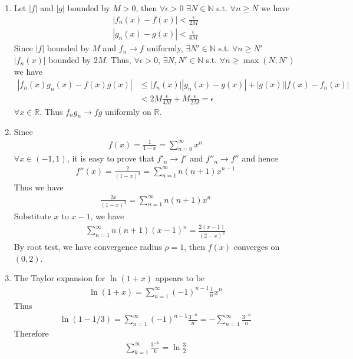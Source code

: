\documentclass[twoside,11pt]{article}
\newcommand{\R}{\mathbb{R}}
\newcommand{\N}{\mathbb{N}}
\theoremstyle{definition}
\theoremstyle{remark}
\begin{document}
\begin{enumerate}
\item Let $|f|$ and $|g|$ bounded by $M>0$, then
$\forall\epsilon>0$ $\exists N\in\N$ s.t.
$\forall n\geq N$ we have
\begin{align*}
    |f_n(x)-f(x)|<\frac{\epsilon}{2M}\\
    |g_n(x)-g(x)|<\frac{\epsilon}{4M}
\end{align*}
Since $|f|$ bounded by $M$ and $f_n\rightarrow f$ uniformly,
$\exists N'\in\N$ s.t. $\forall n\geq N'$ $|f_n(x)|$ bounded by $2M$.
Thus, $\forall\epsilon>0$, $\exists N,N'\in\N$ s.t.
$\forall n\geq\max(N,N')$ we have
\begin{align*}
    |f_n(x)g_n(x)-f(x)g(x)|&\leq
    |f_n(x)||g_n(x)-g(x)| + |g(x)||f(x)-f_n(x)|\\
    &< 2M\frac{\epsilon}{4M} + M\frac{\epsilon}{2M} = \epsilon
\end{align*}
$\forall x\in\R$.
Thus $f_ng_n\rightarrow fg$ uniformly on $\R$.


\item Since
\begin{align*}
    f(x) = \frac{1}{1-x} = \sum_{n=0}^\infty x^n
\end{align*}
$\forall x\in (-1,1)$,
it is easy to prove that $f'_n\rightarrow f'$
and $f''_n\rightarrow f''$ and hence
\begin{align*}
    f''(x) = \frac{2}{(1-x)^3} = \sum_{n=1}^\infty n(n+1)x^{n-1}
\end{align*}
Thus we have
\begin{align*}
    \frac{2x}{(1-x)^3} = \sum_{n=1}^\infty n(n+1)x^n
\end{align*}
Substitute $x$ to $x-1$, we have
\begin{align*}
    \sum_{n=1}^\infty n(n+1)(x-1)^n = \frac{2(x-1)}{(2-x)^3}
\end{align*}
By root test, we have convergence radius $\rho = 1$, then
$f(x)$ converges on $(0, 2)$.


\item The Taylor expansion for $\ln(1+x)$ appears to be
\begin{align*}
    \ln(1+x) = \sum_{n=1}^\infty (-1)^{n-1}\frac{1}{n}x^n
\end{align*}
Thus
\begin{align*}
    \ln(1-1/3) = \sum_{n=1}^\infty (-1)^{n-1}\frac{3^{-n}}{n}
    = -\sum_{n=1}^\infty\frac{3^{-n}}{n}
\end{align*}
Therefore
\begin{align*}
    \sum_{k=1}^\infty\frac{3^{-k}}{k} = \ln\frac{3}{2}
\end{align*}



\end{enumerate}
\end{document}
